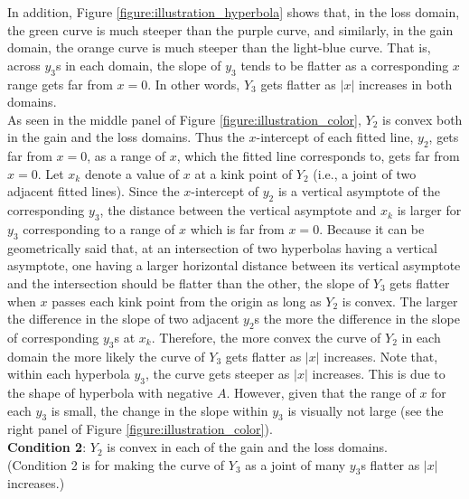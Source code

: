 \documentclass[11pt, a4paper]{article}
\begin{document}
In addition, Figure \ref{figure:illustration_hyperbola} shows that, in the loss domain, the green curve is much steeper than the purple curve, and similarly, in the gain domain, the orange curve is much steeper than the light-blue curve. That is, across $y_3$s in each domain, the slope of $y_3$ tends to be flatter as a corresponding $x$ range gets far from $x=0$.
In other words, $Y_3$ gets flatter as $|x|$ increases in both domains. \\

\noindent
As seen in the middle panel of Figure \ref{figure:illustration_color}, $Y_2$ is convex both in the gain and the loss domains. Thus the $x$-intercept of each fitted line, $y_2$, gets far from $x=0$, as a range of $x$, which the fitted line corresponds to, gets far from $x=0$. 
Let $x_k$ denote a value of $x$ at a kink point of $Y_2$ (i.e., a joint of two adjacent fitted lines).
Since the $x$-intercept of $y_2$ is a vertical asymptote of the corresponding $y_3$, the distance between the vertical asymptote and $x_k$ is larger for $y_3$ corresponding to a range of $x$ which is far from $x=0$. 
Because it can be geometrically said that, at an intersection of two hyperbolas having a vertical asymptote, one having a larger horizontal distance between its vertical asymptote and the intersection should be flatter than the other, the slope of $Y_3$ gets flatter when $x$ passes each kink point from the origin as long as $Y_2$ is convex.
The larger the difference in the slope of two adjacent $y_2$s the more the difference in the slope of corresponding $y_3$s at $x_k$. Therefore, the more convex the curve of $Y_2$ in each domain the more likely the curve of $Y_3$ gets flatter as $|x|$ increases. Note that, within each hyperbola $y_3$, the curve gets steeper as $|x|$ increases. This is due to the shape of hyperbola with negative $A$. However, given that the range of $x$ for each $y_3$ is small, the change in the slope within $y_3$ is visually not large (see the right panel of Figure \ref{figure:illustration_color}).\\    

\noindent
\textbf{Condition 2}: $Y_2$ is convex in each of the gain and the loss domains.\\
(Condition 2 is for making the curve of $Y_3$ as a joint of many $y_3$s flatter as $|x|$ increases.)\\
\end{document}
